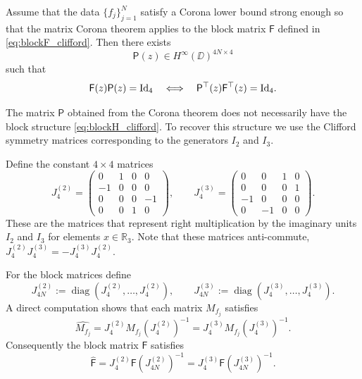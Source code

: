 \documentclass[11pt]{amsart}
\begin{document}
Assume that the data $\{f_j\}_{j=1}^N$ satisfy a Corona lower bound strong enough so that the matrix Corona theorem applies to the block matrix $\mathsf{F}$ defined in \eqref{eq:blockF_clifford}.  Then there exists
\[
\mathsf{P}(z)\in H^\infty(\DD)^{4N\times 4}
\]
such that
\begin{equation}\label{eq:right_inverse_P}
\mathsf{F}(z) \mathsf{P}(z) = \textnormal{Id}_4\quad\Longleftrightarrow\quad \mathsf{P}^{\top}(z) \mathsf{F}^{\top}(z) = \textnormal{Id}_4.
\end{equation}

The matrix $\mathsf{P}$ obtained from the Corona theorem does not necessarily have the block structure \eqref{eq:blockH_clifford}.  To recover this structure we use the Clifford symmetry matrices corresponding to the generators $I_2$ and $I_3$.

Define the constant $4\times4$ matrices
\begin{equation}\label{eq:J4_clifford}
J_4^{(2)}=
\begin{pmatrix}
0 & 1 & 0 & 0\\
-1 & 0 & 0 & 0\\
0 & 0 & 0 & -1\\
0 & 0 & 1 & 0
\end{pmatrix},
\qquad
J_4^{(3)}=
\begin{pmatrix}
0 & 0 & 1 & 0\\
0 & 0 & 0 & 1\\
-1 & 0 & 0 & 0\\
0 & -1 & 0 & 0
\end{pmatrix}.
\end{equation}
These are the matrices that represent right multiplication by the imaginary units $I_2$ and $I_3$ for elements $x\in\mathbb{R}_3$.  Note that these matrices anti-commute, $J_4^{(2)}J_4^{(3)}=-J_4^{(3)}J_4^{(2)}$.

For the block matrices define
\[
J_{4N}^{(2)}:=\operatorname{diag}(J_4^{(2)},\dots,J_4^{(2)}),
\qquad
J_{4N}^{(3)}:=\operatorname{diag}(J_4^{(3)},\dots,J_4^{(3)}).
\]
A direct computation shows that each matrix $M_{f_j}$ satisfies
\begin{equation}\label{eq:symmetry_Mf}
\widehat{M_{f_j}}
=
J_4^{(2)} M_{f_j} (J_4^{(2)})^{-1}
=
J_4^{(3)} M_{f_j} (J_4^{(3)})^{-1}.
\end{equation}
Consequently the block matrix $\mathsf{F}$ satisfies
\begin{equation}\label{eq:symmetry_blockF}
\widehat{\mathsf{F}}
=
J_4^{(2)}  \mathsf{F} (J_{4N}^{(2)})^{-1}
=
J_4^{(3)} \mathsf{F} (J_{4N}^{(3)})^{-1}.
\end{equation}
\end{document}

